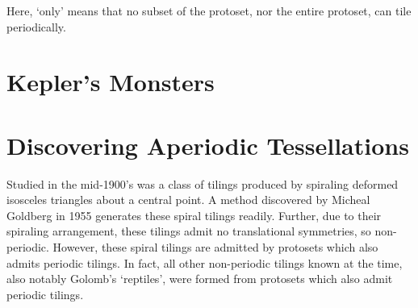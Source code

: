 \documentclass[
  oneside,
  11pt, a4paper,
  footinclude=true,
  headinclude=true,
  cleardoublepage=empty
]{scrbook}
\begin{document}
Here, `only' means that no subset of the protoset, nor the entire protoset, can tile periodically. 


\section{Kepler's Monsters} %
\section{Discovering Aperiodic Tessellations} %
Studied in the mid-1900's was a class of tilings produced by spiraling deformed isosceles triangles about a central point. A method discovered by Micheal Goldberg in 1955 generates these spiral tilings readily. Further, due to their spiraling arrangement, these tilings admit no translational symmetries, so non-periodic. However, these spiral tilings are admitted by protosets which also admits periodic tilings. In fact, all other non-periodic tilings known at the time, also notably Golomb's `reptiles', were formed from protosets which also admit periodic tilings.
\end{document}
